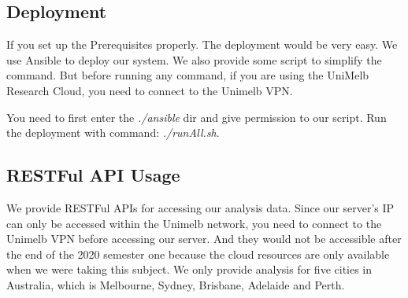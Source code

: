 \documentclass{article}
\begin{document}
\subsection{Deployment}
If you set up the Prerequisites properly. The deployment would be very easy. We use Ansible to deploy our system. We also provide some script to simplify the command. But before running any command, if you are using the UniMelb Research Cloud, you need to connect to the Unimelb VPN.

You need to first enter the \textit{./ansible} dir and give permission to our script. Run the deployment with command: \textit{./runAll.sh}.

\subsection{RESTFul API Usage}
We provide RESTFul APIs for accessing our analysis data. Since our server's IP can only be accessed within the Unimelb network, you need to connect to the Unimelb VPN before accessing our server. And they would not be accessible after the end of the 2020 semester one because the cloud resources are only available when we were taking this subject. We only provide analysis for five cities in Australia, which is Melbourne, Sydney, Brisbane, Adelaide and Perth.
\end{document}
